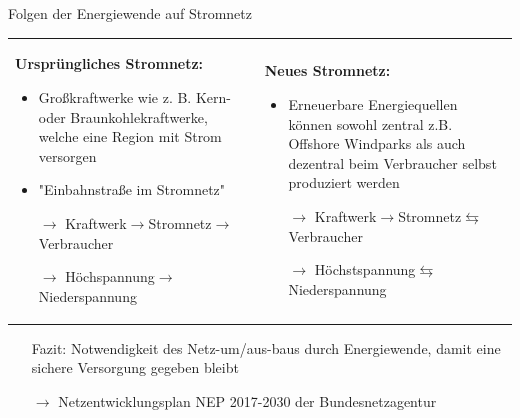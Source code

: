 \documentclass[aspectratio=1610, professionalfonts, 9pt]{beamer}
\begin{document}
\begin{frame}{Folgen der Energiewende auf Stromnetz}
  \begin{tabular}{p{}p{}}
\textbf{\textcolor{tugreen}{Ursprüngliches Stromnetz:}}
\begin{itemize}
  \item Großkraftwerke wie z. B. Kern- oder Braunkohlekraftwerke,
  welche eine Region mit Strom versorgen
  \item "Einbahnstraße im Stromnetz"
\item[$\rightarrow$]  Kraftwerk$\rightarrow$Stromnetz$\rightarrow$Verbraucher
\item[$\rightarrow$]  Höchspannung$\rightarrow$Niederspannung
\end{itemize}
&
\textbf{\textcolor{tugreen}{Neues Stromnetz:}}

\begin{itemize}
  \item Erneuerbare Energiequellen können
  sowohl zentral z.B. Offshore Windparks als auch
  dezentral beim Verbraucher selbst
  produziert werden
\item[$\rightarrow$]  Kraftwerk$\rightarrow$Stromnetz$\leftrightarrows$Verbraucher
\item[$\rightarrow$]  Höchstspannung$\leftrightarrows$Niederspannung
\end{itemize}
\end{tabular}
\begin{itemize}
\item[Fazit:] Notwendigkeit des Netz-um/aus-baus durch Energiewende,
damit eine sichere Versorgung gegeben bleibt
\item[$\rightarrow$] Netzentwicklungsplan NEP 2017-2030 der Bundesnetzagentur
\end{itemize}

\end{frame}
\end{document}
